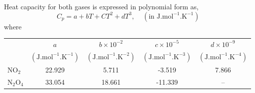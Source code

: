 \documentclass[calculator,allquestions,datasheet,solutions]{exam_newMarcus2}
\begin{document}
\begin{question}
\begin{enumerate}[a)]
{             }
  
          
     \end{enumerate}
     Heat capacity for both gases is expressed in polynomial form as,
  \begin{displaymath}
    C_{p} = a + bT + CT^{2} + dT^{3}, \;\;\;\;\left(\text{in J.mol}^{-1}\text{.K}^{-1}\right)
  \end{displaymath}
  where
  \begin{center}
    \begin{tabular}{ l | c c c c }
      \hline
                         &  $a$     &  $b\times 10^{-2}$  & $c\times 10^{-5}$  & $d\times 10^{-9}$ \\
                         &$\left(\text{J.mol}^{-1}\text{.K}^{-1}\right)$& $\left(\text{J.mol}^{-1}\text{.K}^{-2}\right)$& $\left(\text{J.mol}^{-1}\text{.K}^{-3}\right)$& $\left(\text{J.mol}^{-1}\text{.K}^{-4}\right)$ \\
      \hline
      NO$_{2}$             &  22.929 &      5.711          & -3.519            & 7.866 \\
      N$_{2}$O$_{4}$       &   33.054 &      18.661         &    -11.339        &  -- 
    \end{tabular}
  \end{center}
\end{question}

\clearpage
\end{document}
